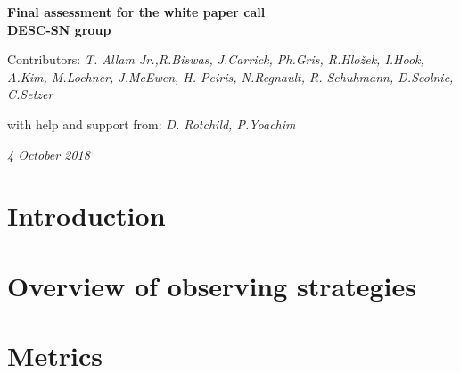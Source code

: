 \documentclass [11pt,a4paper]{article}
\begin{document}
\renewcommand\appendix{\par
  \setcounter{section}{0}
  \setcounter{subsection}{0}
  \setcounter{figure}{0}
  \setcounter{table}{0}
  \renewcommand\thesection{Appendix} %
  \renewcommand\thefigure{\Alph{section}\arabic{figure}}
  \renewcommand\thetable{\Alph{section}\arabic{table}} 
}

\begin{titlepage}
   \begin{center}
      \Large\textbf{Final assessment for the white paper call}\\
        \vspace*{0.5cm}
      \Large\textbf{DESC-SN group} \\
      
		  \vspace*{0.5cm}

      \large Contributors: \large\textit{T. Allam Jr.,R.Biswas, J.Carrick, Ph.Gris, R.Hlo\v{z}ek, I.Hook, A.Kim, M.Lochner, J.McEwen, H. Peiris, N.Regnault, R. Schuhmann, D.Scolnic, C.Setzer} \\
	\vspace*{0.25cm}

    \large with help and support from: \large\textit{D. Rotchild, P.Yoachim} \\
	\vspace*{0.5cm}

      \large\textit{4 October 2018}
   \end{center}
\end{titlepage}


\tableofcontents


\section{Introduction}




\section{Overview of observing strategies}




\section{Metrics}
\end{document}

